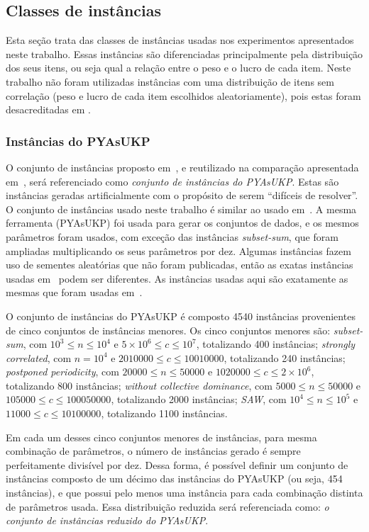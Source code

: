 \subsection{Classes de instâncias}

Esta seção trata das classes de instâncias usadas nos experimentos apresentados neste trabalho.
Essas instâncias são diferenciadas principalmente pela distribuição dos seus itens, ou seja qual a relação entre o peso e o lucro de cada item.
Neste trabalho não foram utilizadas instâncias com uma distribuição de itens sem correlação (peso e lucro de cada item escolhidos aleatoriamente), pois estas foram desacreditadas em \cite{zhu_dominated}.

\subsubsection{Instâncias do PYAsUKP}

O conjunto de instâncias proposto em~\cite{pya}, e reutilizado na comparação apresentada em~\cite{sea2016}, será referenciado como \emph{conjunto de instâncias do PYAsUKP}.
Estas são instâncias geradas artificialmente com o propósito de serem ``difíceis de resolver''.
O conjunto de instâncias usado neste trabalho é similar ao usado em~\cite{pya}.
A mesma ferramenta (PYAsUKP) foi usada para gerar os conjuntos de dados, e os mesmos parâmetros foram usados, com exceção das instâncias \emph{subset-sum}, que foram ampliadas multiplicando os seus parâmetros por dez.
Algumas instâncias fazem uso de sementes aleatórias que não foram publicadas, então as exatas instâncias usadas em~\cite{pya} podem ser diferentes.
As instâncias usadas aqui são exatamente as mesmas que foram usadas em~\cite{sea2016}.

O conjunto de instâncias do PYAsUKP é composto 4540 instâncias provenientes de cinco conjuntos de instâncias menores. Os cinco conjuntos menores são: \emph{subset-sum}, com \(10^3 \leq n \leq 10^4\) e \(5 \times 10^6 \leq c \leq 10^7\), totalizando 400 instâncias; \emph{strongly correlated}, com \(n = 10^4\) e \(2010000 \leq c \leq 10010000\), totalizando 240 instâncias; \emph{postponed periodicity}, com \(20000 \leq n \leq 50000\) e \(1020000 \leq c \leq 2 \times 10^6\), totalizando 800 instâncias; \emph{without collective dominance}, com \(5000 \leq n \leq 50000\) e \(105000 \leq c \leq 100050000\), totalizando 2000 instâncias; \emph{SAW}, com \(10^4 \leq n \leq 10^5\) e \(11000 \leq c \leq 10100000\), totalizando 1100 instâncias.

Em cada um desses cinco conjuntos menores de instâncias, para mesma combinação de parâmetros, o número de instâncias gerado é sempre perfeitamente divisível por dez.
Dessa forma, é possível definir um conjunto de instâncias composto de um décimo das instâncias do PYAsUKP (ou seja, 454 instâncias), e que possui pelo menos uma instância para cada combinação distinta de parâmetros usada.
Essa distribuição reduzida será referenciada como: \emph{o conjunto de instâncias reduzido do PYAsUKP}.

